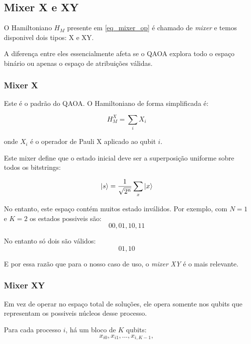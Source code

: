 \documentclass[12pt,a4paper]{article}
\begin{document}
\subsection{Mixer X e XY}
O Hamiltoniano $H_M$ presente em \eqref{eq_mixer_op} é chamado de \textit{mixer} e temos disponivel dois tipos: X e XY.

A diferença entre eles essencialmente afeta se o QAOA explora todo o espaço binário ou apenas o espaço de atribuições válidas.

\subsubsection{Mixer X}
Este é o padrão do QAOA. O Hamiltoniano de forma simplificada é:

\begin{equation}
    H_M^X=\sum_i X_i
\end{equation}

onde $X_i$ é o operador de Pauli X aplicado ao qubit $i$.

Este mixer define que o estado inicial deve ser a superposição uniforme sobre todos os bitstrings:

\begin{equation}
    \ket{s}=\frac{1}{\sqrt{2^n}} \sum_x \ket{x}
\end{equation}

No entanto, este espaço contém muitos estado inválidos. Por exemplo, com $N=1$ e $K=2$ os estados possiveis são:
\begin{equation}
    00, 01, 10, 11
\end{equation}

No entanto só dois são válidos:
\begin{equation}
    01, 10
\end{equation}

E por essa razão que para o nosso caso de uso, o \textit{mixer XY} é o mais relevante.

\subsubsection{Mixer XY}

Em vez de operar no espaço total de soluções, ele opera somente nos qubits que representam os possiveis núcleos desse processo.

Para cada processo $i$, há um bloco de $K$ qubits:
\begin{equation}
    x_{i0},x_{i1},...,x_{i,K-1},
\end{equation}
\end{document}
